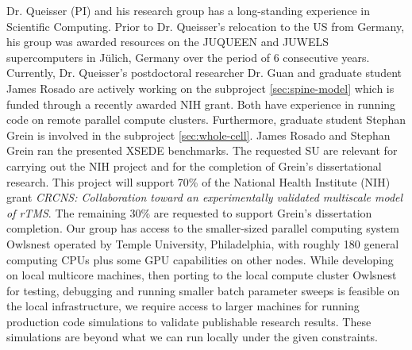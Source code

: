 Dr. Queisser (PI) and his research group has a long-standing experience in Scientific Computing. Prior to Dr. Queisser's relocation to the US from Germany, his group was awarded resources on the JUQUEEN and JUWELS supercomputers in J\"ulich, Germany over the period of 6 consecutive years. Currently, Dr. Queisser's postdoctoral researcher Dr. Guan and graduate student James Rosado are actively working on the subproject \ref{sec:spine-model} which is funded through a recently awarded NIH grant. Both have experience in running code on remote parallel compute clusters. Furthermore, graduate student Stephan Grein is involved in the subproject \ref{sec:whole-cell}. James Rosado and Stephan Grein ran the presented XSEDE benchmarks. The requested SU are relevant for carrying out the NIH project and for the completion of Grein's dissertational research. This project will support 70\% of the National Health Institute (NIH) grant \emph{CRCNS: Collaboration toward an experimentally validated multiscale model of rTMS}. The remaining 30\% are requested to support Grein's dissertation completion. 
Our group has access to the smaller-sized parallel computing system Owlsnest operated by Temple University, Philadelphia, with roughly 180 general computing CPUs plus some GPU capabilities on other nodes. While developing on local multicore machines, then porting to the local compute cluster Owlsnest for testing, debugging and running smaller batch parameter sweeps is feasible on the local infrastructure, we require access to larger machines for running production code simulations to validate publishable research results. These simulations are beyond what we can run locally under the given constraints. 
